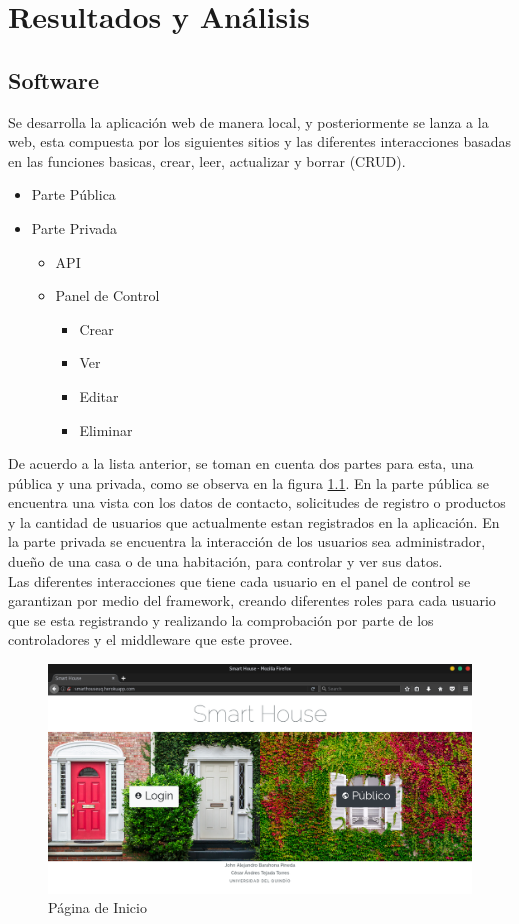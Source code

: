 \chapter{Resultados y Análisis}

\section{Software}

Se desarrolla la aplicación web de manera local, y posteriormente se lanza a la web, esta compuesta por los siguientes sitios y las diferentes interacciones basadas en las funciones basicas, crear, leer, actualizar y borrar (CRUD).

\begin{itemize}
	\item Parte Pública
	\item Parte Privada
	\begin{itemize}
		\item API
		\item Panel de Control
		\begin{itemize}
			\item Crear
			\item Ver
			\item Editar
			\item Eliminar 
		\end{itemize}
	\end{itemize}
\end{itemize}

De acuerdo a la lista anterior, se toman en cuenta dos partes para esta, una pública y una privada, como se observa en la figura \ref{fig:index}. En la parte pública se encuentra una vista con los datos de contacto, solicitudes de registro o productos y la cantidad de usuarios que actualmente estan registrados en la aplicación. En la parte privada se encuentra la interacción de los usuarios sea administrador, dueño de una casa o de una habitación, para controlar y ver sus datos.\\

Las diferentes interacciones que tiene cada usuario en el panel de control se garantizan por medio del framework, creando diferentes roles para cada usuario que se esta registrando y realizando la comprobación por parte de los controladores y el middleware que este provee.

\begin{figure}[H]
\centering
\caption{Página de Inicio}
\label{fig:index}
\includegraphics[width=0.9\linewidth]{Imagenes/Index}
\end{figure}

